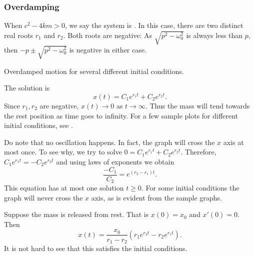 \documentclass[12pt]{book}
\begin{document}
\subsubsection{Overdamping}

When
$c^2 - 4km > 0$, we say the system is \emph{}.  In this case,
there are two distinct real roots $r_1$ and $r_2$.  Both roots are
negative:  As $\sqrt{p^2 - \omega_0^2}$ is always less than $p$,
then
$-p \pm \sqrt{p^2 - \omega_0^2}$ is negative in either case.

\begin{diffyfloatingfigurepdfonly}{3.1in}
\capstart
\begin{center}
\diffypdfversion{\vspace*{-0.4cm}}
\caption{Overdamped motion for several different initial conditions.\label{mv:overdampedfig}}
\diffypdfversion{\vspace*{0.4cm}}
\end{center}
\end{diffyfloatingfigurepdfonly}

The solution is
\begin{equation*}
x(t) = C_1 e^{r_1 t} + C_2 e^{r_2 t} .
\end{equation*}
Since $r_1, r_2$ are negative, $x(t) \to 0$ as $t \to \infty$.
Thus the mass will tend towards the rest position as
time goes to infinity.  For a few sample plots for different initial
conditions, see .

Do note that no oscillation happens.  In fact, the graph will cross the $x$
axis at most once.  To see why, we try to solve
$0 = C_1 e^{r_1 t} + C_2 e^{r_2 t}$.
Therefore, $C_1 e^{r_1 t} = - C_2 e^{r_2 t}$ and using laws of exponents we
obtain
\begin{equation*}
\frac{-C_1}{C_2} = e^{(r_2-r_1) t} .
\end{equation*}
This equation has at most one solution $t \geq 0$.
For some initial conditions the graph will never cross the $x$ axis, as is
evident from the sample graphs.

\begin{example}
Suppose the mass is released from rest.  That is
$x(0) = x_0$ and $x'(0) = 0$.
Then
\begin{equation*}
x(t) = \frac{x_0}{r_1-r_2} \left(r_1 e^{r_2 t} - r_2 e^{r_1 t} \right) .
\end{equation*}
It is not hard to see that this satisfies the initial conditions.
\end{example}
\end{document}
